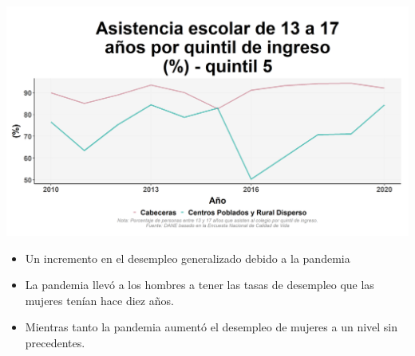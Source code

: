 \documentclass[aspectratio=169]{beamer}
\begin{document}
    
        \begin{slide}{15} 
            \begin{imagecolumn}
                \includegraphics[width=\columnwidth]{img/var_98_trend.png}
            \end{imagecolumn}
            \begin{textcolumn}
                \begin{itemize}
                    \item Un incremento en el desempleo generalizado debido a la pandemia
                    \item La pandemia llevó a los hombres a tener las tasas de desempleo que las mujeres tenían hace diez años. 
                    \item Mientras tanto la pandemia aumentó el desempleo de mujeres a un nivel sin precedentes.
                \end{itemize}
            \end{textcolumn}
    \printcolumns
    \end{slide}
    
\end{document}
